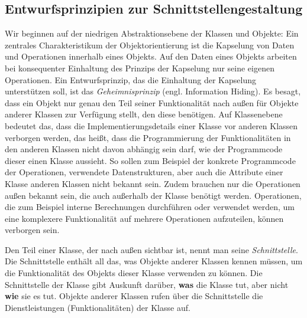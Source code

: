 \subsection{Entwurfsprinzipien zur Schnittstellengestaltung}
\label{sec:Kap-7.2.1}

Wir beginnen auf der niedrigen Abstraktionsebene der Klassen und Objekte: Ein zentrales Charakteristikum der Objektorientierung ist die Kapselung von Daten und Operationen innerhalb eines Objekts. Auf den Daten eines Objekts arbeiten bei konsequenter Einhaltung des Prinzips der Kapselung nur seine eigenen Operationen. Ein Entwurfsprinzip, das die Einhaltung der Kapselung unterstützen soll, ist das \textit{Geheimnisprinzip} 
(engl. Information Hiding). Es besagt, dass ein Objekt nur genau den Teil seiner Funktionalität nach außen für Objekte anderer Klassen zur Verfügung stellt, den diese benötigen. Auf Klassenebene bedeutet das, dass die Implemen\-tierungs\-details einer Klasse vor anderen Klassen verborgen werden, das heißt, dass die Programmierung der Funktionalitäten in den anderen Klassen nicht davon abhängig sein darf, wie der Programmcode dieser einen Klasse aussieht. So sollen zum Beispiel der konkrete Programmcode der Operationen, verwendete Daten\-strukturen, aber auch die Attribute einer Klasse anderen Klassen nicht bekannt sein. Zudem brauchen nur die Operationen außen bekannt sein, die auch außerhalb der Klasse benötigt werden. Operationen, die zum Beispiel interne Berechnungen durchführen oder verwendet werden, um eine komplexere Funktionalität auf mehrere Operationen aufzuteilen, können verborgen sein. 

Den Teil einer Klasse, der nach außen sichtbar ist, nennt man seine \textit{Schnittstelle}. Die Schnittstelle enthält all das, was Objekte anderer Klassen kennen müssen, um die Funktionalität des Objekts dieser Klasse verwenden zu können.  Die Schnittstelle der Klasse gibt Auskunft darüber, \textbf{was} die Klasse tut, aber nicht \textbf{wie} sie es tut. Objekte anderer Klassen rufen über die Schnittstelle die Dienstleistungen (Funktionalitäten) der Klasse auf.

\vspace{-0.1mm} %

